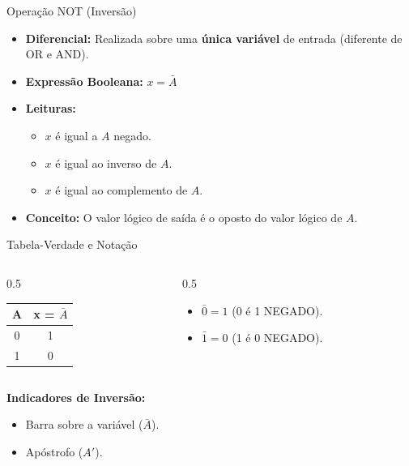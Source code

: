 \begin{frame}{Operação NOT (Inversão)}
    \begin{itemize}
        \item \textbf{Diferencial:} Realizada sobre uma \textbf{única variável} de entrada (diferente de OR e AND).
        \item \textbf{Expressão Booleana:} $x = \bar{A}$
        \item \textbf{Leituras:}
              \begin{itemize}
                  \item $x$ é igual a $A$ negado.
                  \item $x$ é igual ao inverso de $A$.
                  \item $x$ é igual ao complemento de $A$.
              \end{itemize}
        \item \textbf{Conceito:} O valor lógico de saída é o oposto do valor lógico de $A$.
    \end{itemize}
\end{frame}

\begin{frame}{Tabela-Verdade e Notação}
    \begin{columns}
        \begin{column}{0.5\textwidth}
            \begin{table}
                \centering
                \begin{tabular}{|c|c|}
                    \hline
                    \textbf{A} & \textbf{x = $\bar{A}$} \\ \hline
                    0          & 1                      \\ \hline
                    1          & 0                      \\ \hline
                \end{tabular}
            \end{table}
        \end{column}
        \begin{column}{0.5\textwidth}
            \begin{itemize}
                \item $\bar{0} = 1$ (0 é 1 NEGADO).
                \item $\bar{1} = 0$ (1 é 0 NEGADO).
            \end{itemize}
        \end{column}
    \end{columns}
    \vspace{0.4cm}
    \textbf{Indicadores de Inversão:}
    \begin{itemize}
        \item Barra sobre a variável ($\bar{A}$).
        \item Apóstrofo ($A'$).
    \end{itemize}
\end{frame}

